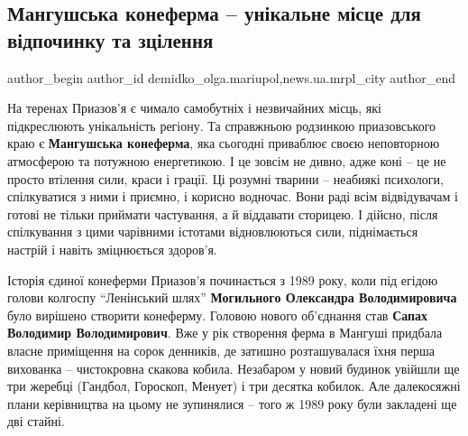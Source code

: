  
 
 
 
 
 
\subsection{Мангушська конеферма – унікальне місце для відпочинку та зцілення}
\label{sec:24_10_2019.stz.news.ua.mrpl_city.1.mangush_koneferma}
 
\ifcmt
 author_begin
   author_id demidko_olga.mariupol,news.ua.mrpl_city
 author_end
\fi


На теренах Приазов'я є чимало самобутніх і незвичайних місць, які підкреслюють
унікальність регіону. Та справжньою родзинкою приазовського краю є \textbf{Мангушська
конеферма}, яка сьогодні приваблює своєю неповторною атмосферою та потужною
енергетикою. І це зовсім не дивно, адже коні – це не просто втілення сили,
краси і грації. Ці розумні тварини – неабиякі психологи, спілкуватися з ними і
приємно, і корисно водночас. Вони раді всім відвідувачам і готові не тільки
приймати частування, а й віддавати сторицею. І дійсно, після спілкування з цими
чарівними істотами відновлюються сили, піднімається настрій і навіть
зміцнюється здоров'я.


Історія єдиної конеферми Приазов'я починається з 1989 року, коли під егідою
голови колгоспу \enquote{Ленінський шлях} \textbf{Могильного Олександра Володимировича} було
вирішено створити конеферму. Головою нового об'єднання став \textbf{Сапах Володимир
Володимирович}. Вже у рік створення ферма в Мангуші придбала власне приміщення
на сорок денників, де затишно розташувалася їхня перша вихованка – чистокровна
скакова кобила. Незабаром у новий будинок увійшли ще три жеребці (Гандбол,
Гороскоп, Менует) і три десятка кобилок. Але далекосяжні плани керівництва на
цьому не зупинялися – того ж 1989 року були закладені ще дві стайні. 

